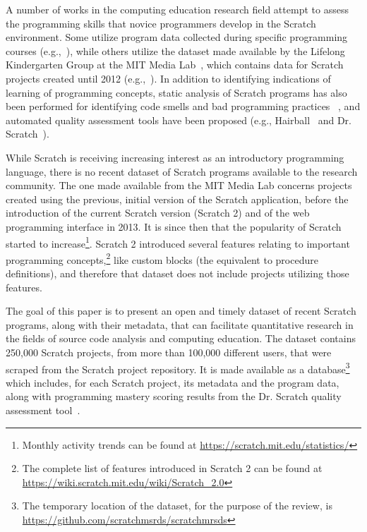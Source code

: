 \documentclass[10pt, conference]{IEEEtran}
\begin{document}
A number of works in the computing education research field attempt to assess the programming skills that novice programmers develop in the Scratch environment.
Some utilize program data collected during specific programming courses (e.g.,~\cite{meerbaum-salant_learning_2010, wilson_evaluation_2012, Maloney_2008}), while others utilize the dataset made available by the Lifelong Kindergarten Group at the MIT Media Lab~\cite{2017_scratch_dataset}, which contains data for Scratch projects created until 2012 (e.g.,~\cite{fields_2014, yang_2015, Dasgupta_2016}).
In addition to identifying indications of learning of programming concepts, static analysis of Scratch programs has also been performed for identifying code smells and bad programming practices ~\cite{Meerbaum_habits_2011, Aivaloglou_2016}, and automated quality assessment tools have been proposed (e.g., Hairball~\cite{boe_hairball:_2013} and Dr. Scratch~\cite{moreno_automatic_2014}).

While Scratch is receiving increasing interest as an introductory programming language, there is no recent dataset of Scratch programs available to the research community.
The one made available from the MIT Media Lab concerns projects created using the previous, initial version of the Scratch application, before the introduction of the current Scratch version (Scratch 2) and of the web programming interface in 2013.
It is since then that the popularity of Scratch started to increase\footnote{Monthly activity trends can be found at \url{https://scratch.mit.edu/statistics/}}. Scratch 2 introduced several features relating to important programming concepts,\footnote{The complete list of features introduced in Scratch 2 can be found at \url{https://wiki.scratch.mit.edu/wiki/Scratch\_2.0}} like custom blocks (the equivalent to procedure definitions), and therefore that dataset does not include projects utilizing those features.

The goal of this paper is to present an open and timely dataset of recent Scratch programs, along with their metadata, that can facilitate quantitative research in the fields of source code analysis and computing education.
The dataset contains 250,000 Scratch projects, from more than 100,000 different users, that were scraped from the Scratch project repository.
It is made available as a database\footnote{\label{dataseturl}The temporary location of the dataset, for the purpose of the review, is \url{https://github.com/scratchmsrds/scratchmrsds}} which includes, for each Scratch project, its metadata and the program data, along with programming mastery scoring results from the Dr. Scratch quality assessment tool~\cite{moreno_automatic_2014}.
\end{document}
